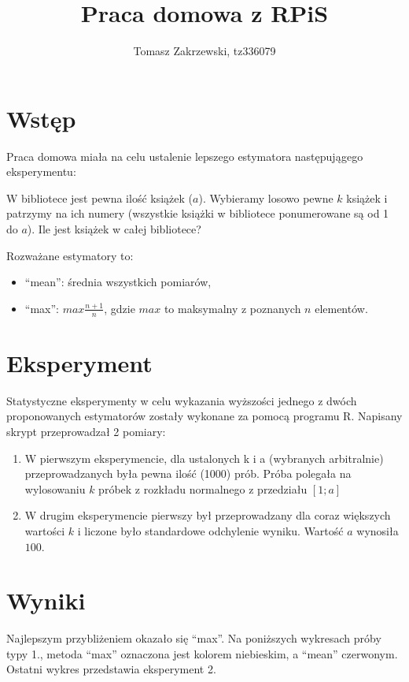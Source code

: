 \documentclass[a4paper,10pt]{article}
\author{Tomasz Zakrzewski, tz336079}
\title{Praca domowa z RPiS}
\begin{document}
\maketitle

\section{Wstęp}
Praca domowa miała na celu ustalenie lepszego estymatora następujągego eksperymentu:

W bibliotece jest pewna ilość książek ($a$). Wybieramy losowo pewne $k$ książek i patrzymy na ich numery 
(wszystkie książki w bibliotece ponumerowane są od 1 do $a$). Ile jest książek w całej bibliotece?

Rozważane estymatory to:
\begin{itemize}
 \item ``mean'': średnia wszystkich pomiarów,
 \item ``max'': $max \frac{n + 1}{n}$, gdzie $max$ to maksymalny z poznanych $n$ elementów. 
\end{itemize}

\section{Eksperyment}
Statystyczne eksperymenty w celu wykazania wyższości jednego z dwóch proponowanych estymatorów zostały wykonane za pomocą programu R.
Napisany skrypt przeprowadzał 2 pomiary:
\begin{enumerate}
 \item W pierwszym eksperymencie, dla ustalonych k i a (wybranych arbitralnie) przeprowadzanych była pewna ilość (1000) prób. Próba polegała na 
 wylosowaniu $k$ próbek z rozkładu normalnego z przedziału $[1; a]$
 \item W drugim eksperymencie pierwszy był przeprowadzany dla coraz większych wartości $k$ i liczone było standardowe odchylenie wyniku. Wartość
 $a$ wynosiła $100$.
\end{enumerate}

\section{Wyniki}
Najlepszym przybliżeniem okazało się ``max''.
Na poniższych wykresach próby typy 1., metoda ``max'' oznaczona jest kolorem niebieskim, a ``mean'' czerwonym. Ostatni wykres przedstawia
eksperyment 2.
\end{document}

